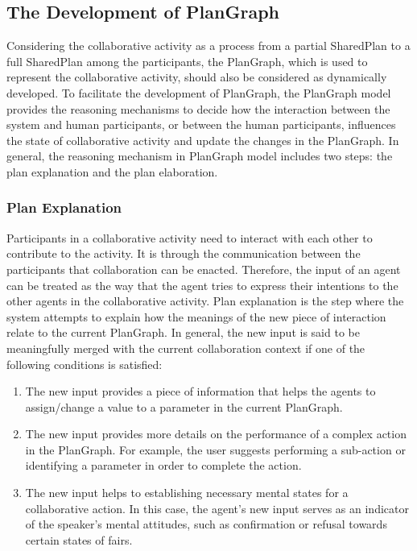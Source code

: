 \subsection{The Development of PlanGraph} %
\label{sub:the_development_of_plangraph}
Considering the collaborative activity as a process from a partial SharedPlan to a full SharedPlan among the participants, the PlanGraph, which is used to represent the collaborative activity, should also be considered as dynamically developed. To facilitate the development of PlanGraph, the PlanGraph model provides the reasoning mechanisms to decide how the interaction between the system and human participants, or between the human participants, influences the state of collaborative activity and update the changes in the PlanGraph. In general, the reasoning mechanism in PlanGraph model includes two steps: the plan explanation and the plan elaboration.

\subsubsection*{Plan Explanation}
Participants in a collaborative activity need to interact with each other to contribute to the activity. It is through the communication between the participants that collaboration can be enacted. Therefore, the input of an agent can be treated as the way that the agent tries to express their intentions to the other agents in the collaborative activity. Plan explanation is the step where the system attempts to explain how the meanings of the new piece of interaction relate to the current PlanGraph. In general, the new input is said to be meaningfully merged with the current collaboration context if one of the following conditions is satisfied:

\begin{enumerate}
\item The new input provides a piece of information that helps the agents to assign/change a value to a parameter in the current PlanGraph. 
\item The new input provides more details on the performance of a complex action in the PlanGraph. For example, the user suggests performing a sub-action or identifying a parameter in order to complete the action.
\item The new input helps to establishing necessary mental states for a collaborative action. In this case, the agent's new input serves as an indicator of the speaker's mental attitudes, such as confirmation or refusal towards certain states of fairs. 
\end{enumerate}

